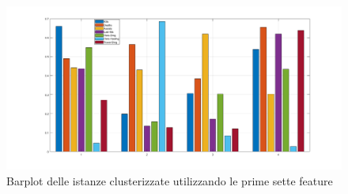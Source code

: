 \documentclass[a4paper,12pt,openany,oneside]{book}
\begin{document}
\begin{figure}[H]
	\includegraphics[width=\linewidth]{pics/1to7/barplot.png}
	\caption{Barplot delle istanze clusterizzate utilizzando le prime sette feature}
	\label{fig:baroplot_1}
\end{figure}
\end{document}
